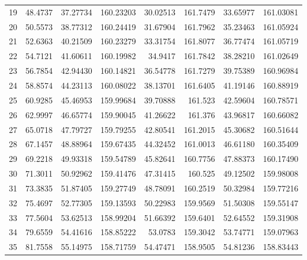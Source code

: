 \begin{table}[ht!]
{\begin{tabular}{@{}rrrrrrrr@{}}
19 & 48.4737 & 37.27734 & 160.23203 & 30.02513 & 161.7479 & 33.65977 & 161.03081 \\
20 & 50.5573 & 38.77312 & 160.24419 & 31.67904 & 161.7962 & 35.23463 & 161.05924 \\
21 & 52.6363 & 40.21509 & 160.23279 & 33.31754 & 161.8077 & 36.77474 & 161.05719 \\
22 & 54.7121 & 41.60611 & 160.19982 & 34.9417  & 161.7842 & 38.28210 & 161.02649 \\
23 & 56.7854 & 42.94430 & 160.14821 & 36.54778 & 161.7279 & 39.75389 & 160.96984 \\
24 & 58.8574 & 44.23113 & 160.08022 & 38.13701 & 161.6405 & 41.19146 & 160.88919 \\
25 & 60.9285 & 45.46953 & 159.99684 & 39.70888 & 161.523  & 42.59604 & 160.78571 \\
26 & 62.9997 & 46.65774 & 159.90045 & 41.26622 & 161.376  & 43.96817 & 160.66082 \\
27 & 65.0718 & 47.79727 & 159.79255 & 42.80541 & 161.2015 & 45.30682 & 160.51644 \\
28 & 67.1457 & 48.88964 & 159.67435 & 44.32452 & 161.0013 & 46.61180 & 160.35409 \\
29 & 69.2218 & 49.93318 & 159.54789 & 45.82641 & 160.7756 & 47.88373 & 160.17490 \\
30 & 71.3011 & 50.92962 & 159.41476 & 47.31415 & 160.525  & 49.12502 & 159.98008 \\
31 & 73.3835 & 51.87405 & 159.27749 & 48.78091 & 160.2519 & 50.32984 & 159.77216 \\
32 & 75.4697 & 52.77305 & 159.13593 & 50.22983 & 159.9569 & 51.50308 & 159.55147 \\
33 & 77.5604 & 53.62513 & 158.99204 & 51.66392 & 159.6401 & 52.64552 & 159.31908 \\
34 & 79.6559 & 54.41616 & 158.85222 & 53.0783  & 159.3042 & 53.74771 & 159.07963 \\
35 & 81.7558 & 55.14975 & 158.71759 & 54.47471 & 158.9505 & 54.81236 & 158.83443 \\ \bottomrule
\end{tabular}%
}
\end{table}
\vfill
\clearpage

